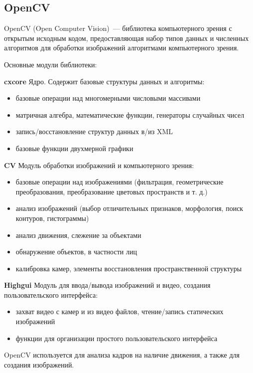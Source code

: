 \subsection{OpenCV}
OpenCV (Open Computer Vision)~--- библиотека компьютерного зрения с открытым исходным кодом,
предоставляющая набор типов данных и численных алгоритмов для обработки изображений алгоритмами
компьютерного зрения.

\medskip
Основные модули библиотеки:
\smallskip

\textbf{cxcore}
\smallskip
Ядро. Содержит базовые структуры данных и алгоритмы:
\smallskip
\begin{itemize}
	\item базовые операции над многомерными числовыми массивами
	\item матричная алгебра, математические функции, генераторы случайных чисел
	\item запись/восстановление структур данных в/из XML
	\item базовые функции двухмерной графики
\end{itemize}

\medskip
\textbf{CV}
\smallskip
Модуль обработки изображений и компьютерного зрения:
\smallskip
\begin{itemize}
	\item
	базовые операции над изображениями (фильтрация, геометрические преобразования,
	преобразование цветовых пространств и т. д.)
	\item
	анализ изображений (выбор отличительных признаков, морфология, поиск контуров, гистограммы)
	\item
	анализ движения, слежение за объектами
	\item
	обнаружение объектов, в частности лиц
	\item
	калибровка камер, элементы восстановления пространственной структуры
\end{itemize}

\medskip
\textbf{Highgui}
Модуль для ввода/вывода изображений и видео, создания пользовательского интерфейса:
\smallskip
\begin{itemize}
	\item захват видео с камер и из видео файлов, чтение/запись статических изображений
	\item функции для организации простого пользовательского интерфейса
\end{itemize}

\medskip
OpenCV используется для анализа кадров на наличие движения, а также для создания изображений.

